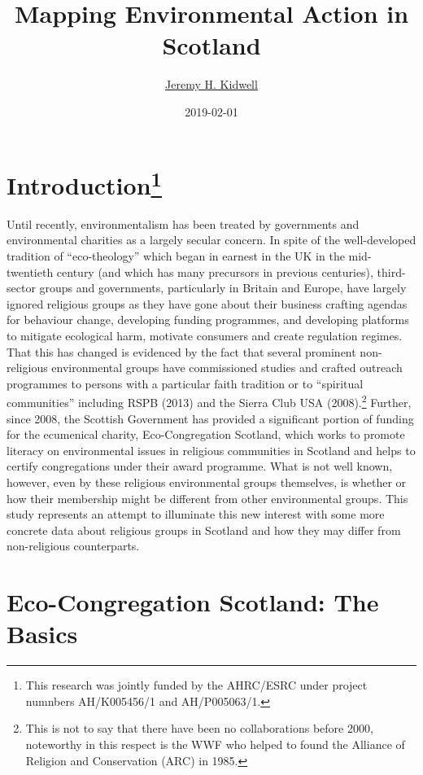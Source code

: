\documentclass[11pt,]{article}
\title{Mapping Environmental Action in Scotland}
\author{\href{http://jeremykidwell.info}{Jeremy H. Kidwell}}
\date{2019-02-01}
\let\rmarkdownfootnote\footnote%
\def\footnote{\protect\rmarkdownfootnote}
\begin{document}
\maketitle

\hypertarget{introduction15541312}{%
\section[Introduction]{\texorpdfstring{Introduction\footnote{This
  research was jointly funded by the AHRC/ESRC under project numnbers
  AH/K005456/1 and AH/P005063/1.}}{Introduction}}\label{introduction15541312}}

Until recently, environmentalism has been treated by governments and
environmental charities as a largely secular concern. In spite of the
well-developed tradition of ``eco-theology'' which began in earnest in
the UK in the mid-twentieth century (and which has many precursors in
previous centuries), third-sector groups and governments, particularly
in Britain and Europe, have largely ignored religious groups as they
have gone about their business crafting agendas for behaviour change,
developing funding programmes, and developing platforms to mitigate
ecological harm, motivate consumers and create regulation regimes. That
this has changed is evidenced by the fact that several prominent
non-religious environmental groups have commissioned studies and crafted
outreach programmes to persons with a particular faith tradition or to
``spiritual communities'' including RSPB (2013) and the Sierra Club USA
(2008).\footnote{This is not to say that there have been no
  collaborations before 2000, noteworthy in this respect is the WWF who
  helped to found the Alliance of Religion and Conservation (ARC) in
  1985.} Further, since 2008, the Scottish Government has provided a
significant portion of funding for the ecumenical charity,
Eco-Congregation Scotland, which works to promote literacy on
environmental issues in religious communities in Scotland and helps to
certify congregations under their award programme. What is not well
known, however, even by these religious environmental groups themselves,
is whether or how their membership might be different from other
environmental groups. This study represents an attempt to illuminate
this new interest with some more concrete data about religious groups in
Scotland and how they may differ from non-religious counterparts.

\hypertarget{eco-congregation-scotland-the-basics}{%
\section{Eco-Congregation Scotland: The
Basics}\label{eco-congregation-scotland-the-basics}}
\end{document}
